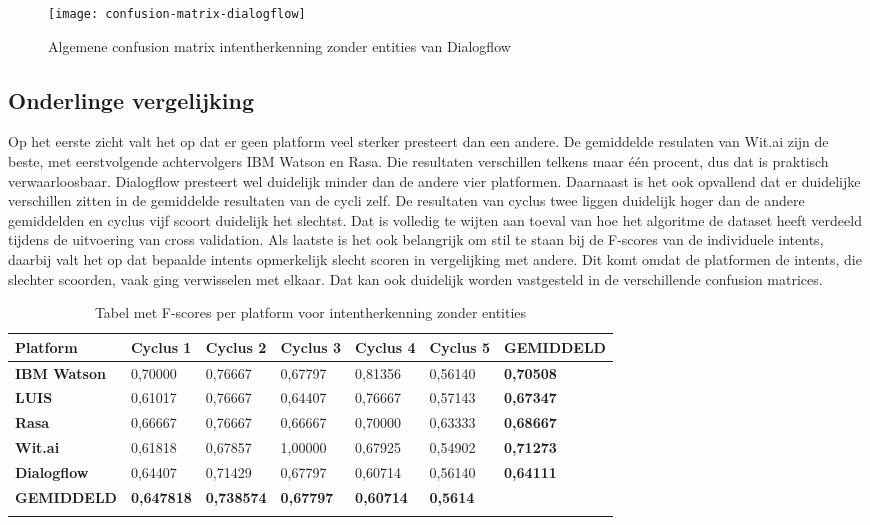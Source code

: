 \begin{figure}[H]
    \label{fig:confusion-matrix-dialogflow}
    \centering
    \texttt{[image: confusion-matrix-dialogflow]}
    \caption{Algemene confusion matrix intentherkenning zonder entities van Dialogflow}
\end{figure}

\subsection{Onderlinge vergelijking}
\label{subsec:intent-onderling}

Op het eerste zicht valt het op dat er geen platform veel sterker presteert dan een andere. De gemiddelde resulaten van Wit.ai zijn de beste, met eerstvolgende achtervolgers IBM Watson en Rasa. Die resultaten verschillen telkens maar één procent, dus dat is praktisch verwaarloosbaar. Dialogflow presteert wel duidelijk minder dan de andere vier platformen. Daarnaast is het ook opvallend dat er duidelijke verschillen zitten in de gemiddelde resultaten van de cycli zelf. De resultaten van cyclus twee liggen duidelijk hoger dan de andere gemiddelden en cyclus vijf scoort duidelijk het slechtst. Dat is volledig te wijten aan toeval van hoe het algoritme de dataset heeft verdeeld tijdens de uitvoering van cross validation. Als laatste is het ook belangrijk om stil te staan bij de F-scores van de individuele intents, daarbij valt het op dat bepaalde intents opmerkelijk slecht scoren in vergelijking met andere. Dit komt omdat de platformen de intents, die slechter scoorden, vaak ging verwisselen met elkaar. Dat kan ook duidelijk worden vastgesteld in de verschillende confusion matrices.

\begin{center}
    \begin{longtable}{| l | l | l | l | l |  l | l |}
        \hline
        \textbf{Platform} & \textbf{Cyclus 1} & \textbf{Cyclus 2} & \textbf{Cyclus 3} & \textbf{Cyclus 4} & \textbf{Cyclus 5} & \textbf{GEMIDDELD} \\ \hline
        \textbf{IBM Watson} & 0,70000 & 0,76667 & 0,67797 & 0,81356 & 0,56140 & \textbf{0,70508} \\ \hline  
        \textbf{LUIS} & 0,61017 & 0,76667 & 0,64407 & 0,76667 & 0,57143 & \textbf{0,67347} \\ \hline  
        \textbf{Rasa} & 0,66667 & 0,76667 & 0,66667 & 0,70000 & 0,63333 & \textbf{0,68667} \\ \hline  
        \textbf{Wit.ai} & 0,61818 & 0,67857 & 1,00000 & 0,67925 & 0,54902 & \textbf{0,71273} \\ \hline  
        \textbf{Dialogflow} & 0,64407 & 0,71429 & 0,67797 & 0,60714 & 0,56140 & \textbf{0,64111} \\ \hline  
        \textbf{GEMIDDELD} & \textbf{0,647818} & \textbf{0,738574} & \textbf{0,67797} & \textbf{0,60714} & \textbf{0,5614} &    \\ \hline
        \caption{Tabel met F-scores per platform voor intentherkenning zonder entities}                                    
    \end{longtable}
    \label{tbl:results-intent-no-entity}
\end{center}

